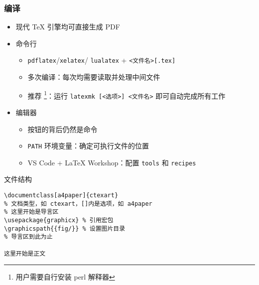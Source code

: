 \begin{frame}[fragile]
  \frametitle{编译}
  \begin{itemize}
    \item 现代 \TeX{} 引擎均可直接生成 PDF
    \item 命令行

          \begin{itemize}
            \item \verb|pdflatex|/\verb|xelatex|/
                  \verb|lualatex| + \verb|<文件名>[.tex]|
            \item 多次编译：每次均需要读取并处理中间文件
            \item 推荐 \footnote{\MiKTeX 用户需要自行安装 perl 解释器}：运行
                  \verb|latexmk [<选项>] <文件名>| 即可自动完成所有工作
          \end{itemize}

    \item 编辑器

          \begin{itemize}
            \item 按钮的背后仍然是命令
            \item \verb|PATH| 环境变量：确定可执行文件的位置
            \item VS Code + \LaTeX{} Workshop：配置 \verb|tools| 和 \verb|recipes|
          \end{itemize}
  \end{itemize}
\end{frame}

\begin{frame}[fragile]{文件结构}
  \lstset{language=[LaTeX]TeX}
  \begin{lstlisting}[basicstyle=\ttfamily]
\documentclass[a4paper]{ctexart}
% 文档类型，如 ctexart，[]内是选项，如 a4paper
% 这里开始是导言区
\usepackage{graphicx} % 引用宏包
\graphicspath{{fig/}} % 设置图片目录
% 导言区到此为止

这里开始是正文

  \end{lstlisting}
\end{frame}

